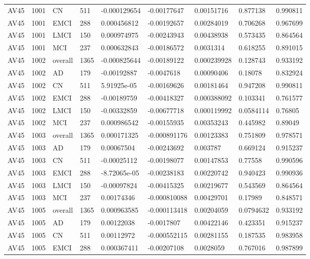 \begin{landscape}
\begin{longtable}{lllllllll}
AV45 & 1001 & CN & 511 & -0.000129654 & -0.00177647 & 0.00151716 & 0.877138 & 0.990811 \\
AV45 & 1001 & EMCI & 288 & 0.000456812 & -0.00192657 & 0.00284019 & 0.706268 & 0.967699 \\
AV45 & 1001 & LMCI & 150 & 0.000974975 & -0.00243943 & 0.00438938 & 0.573435 & 0.864564 \\
AV45 & 1001 & MCI & 237 & 0.000632843 & -0.00186572 & 0.0031314 & 0.618255 & 0.891015 \\
AV45 & 1002 & overall & 1365 & -0.000825644 & -0.00189122 & 0.000239928 & 0.128743 & 0.933192 \\
AV45 & 1002 & AD & 179 & -0.00192887 & -0.0047618 & 0.00090406 & 0.18078 & 0.832924 \\
AV45 & 1002 & CN & 511 & 5.91925e-05 & -0.00169626 & 0.00181464 & 0.947208 & 0.990811 \\
AV45 & 1002 & EMCI & 288 & -0.00189759 & -0.00418327 & 0.000388092 & 0.103341 & 0.761577 \\
AV45 & 1002 & LMCI & 150 & -0.00332859 & -0.00677718 & 0.000119992 & 0.0584114 & 0.76805 \\
AV45 & 1002 & MCI & 237 & 0.000986542 & -0.00155935 & 0.00353243 & 0.445982 & 0.89049 \\
AV45 & 1003 & overall & 1365 & 0.000171325 & -0.000891176 & 0.00123383 & 0.751809 & 0.978571 \\
AV45 & 1003 & AD & 179 & 0.00067504 & -0.00243692 & 0.003787 & 0.669124 & 0.915237 \\
AV45 & 1003 & CN & 511 & -0.00025112 & -0.00198077 & 0.00147853 & 0.77558 & 0.990596 \\
AV45 & 1003 & EMCI & 288 & -8.72065e-05 & -0.00238183 & 0.00220742 & 0.940423 & 0.990936 \\
AV45 & 1003 & LMCI & 150 & -0.00097824 & -0.00415325 & 0.00219677 & 0.543569 & 0.864564 \\
AV45 & 1003 & MCI & 237 & 0.00174346 & -0.000810088 & 0.00429701 & 0.17989 & 0.848571 \\
AV45 & 1005 & overall & 1365 & 0.000963585 & -0.000113418 & 0.00204059 & 0.0794632 & 0.933192 \\
AV45 & 1005 & AD & 179 & 0.00122038 & -0.0017807 & 0.00422146 & 0.423351 & 0.915237 \\
AV45 & 1005 & CN & 511 & 0.00112972 & -0.000552115 & 0.00281155 & 0.187535 & 0.983958 \\
AV45 & 1005 & EMCI & 288 & 0.000367411 & -0.00207108 & 0.0028059 & 0.767016 & 0.987899 \\

\end{longtable}
\end{landscape}
